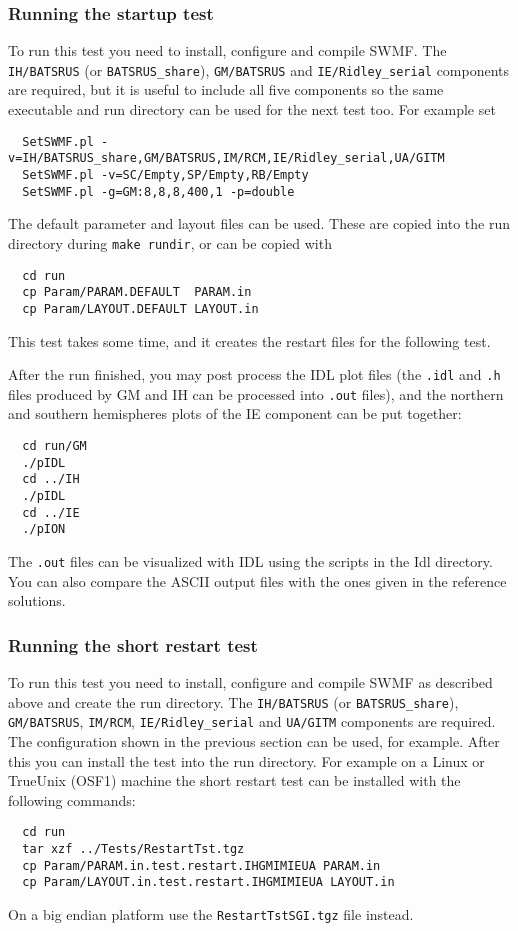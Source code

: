 \documentclass[twoside,10pt]{article}
\begin{document}
\subsubsection{Running the startup test}

To run this test you need to install, configure and compile SWMF.
The {\tt IH/BATSRUS} (or {\tt BATSRUS\_share}), 
{\tt GM/BATSRUS} and {\tt IE/Ridley\_serial}
components are required, but it is useful to include all five
components so the same executable and run directory 
can be used for the next test too. For example set
\begin{verbatim}
  SetSWMF.pl -v=IH/BATSRUS_share,GM/BATSRUS,IM/RCM,IE/Ridley_serial,UA/GITM
  SetSWMF.pl -v=SC/Empty,SP/Empty,RB/Empty
  SetSWMF.pl -g=GM:8,8,8,400,1 -p=double
\end{verbatim}
The default parameter and layout files can be used. 
These are copied into the run directory during {\tt make rundir},
or can be copied with
\begin{verbatim}
  cd run
  cp Param/PARAM.DEFAULT  PARAM.in
  cp Param/LAYOUT.DEFAULT LAYOUT.in
\end{verbatim}
This test takes some time, and it creates the restart files
for the following test. 

After the run finished, you may post process the IDL plot files (the
{\tt .idl} and {\tt .h} files produced by GM and IH can be processed
into {\tt .out} files), and the northern and southern hemispheres
plots of the IE component can be put together: 
\begin{verbatim}
  cd run/GM
  ./pIDL
  cd ../IH
  ./pIDL
  cd ../IE
  ./pION
\end{verbatim}
The {\tt .out} files can be visualized with IDL using the scripts in
the Idl directory.  You can also compare the ASCII output files with
the ones given in the reference solutions.

\subsubsection{Running the short restart test}

To run this test you need to install, configure and compile SWMF
as described above and create the run directory. 
The {\tt IH/BATSRUS} (or {\tt BATSRUS\_share}),
{\tt GM/BATSRUS}, {\tt IM/RCM}, {\tt IE/Ridley\_serial} and
{\tt UA/GITM} components are required. The configuration shown
in the previous section can be used, for example.
After this you can install the test into the run directory.  
For example on a Linux or TrueUnix
(OSF1) machine the short restart test can be installed with the
following commands:
\begin{verbatim}
  cd run
  tar xzf ../Tests/RestartTst.tgz
  cp Param/PARAM.in.test.restart.IHGMIMIEUA PARAM.in
  cp Param/LAYOUT.in.test.restart.IHGMIMIEUA LAYOUT.in
\end{verbatim}
On a big endian platform use the {\tt RestartTstSGI.tgz} file instead.
\end{document}
